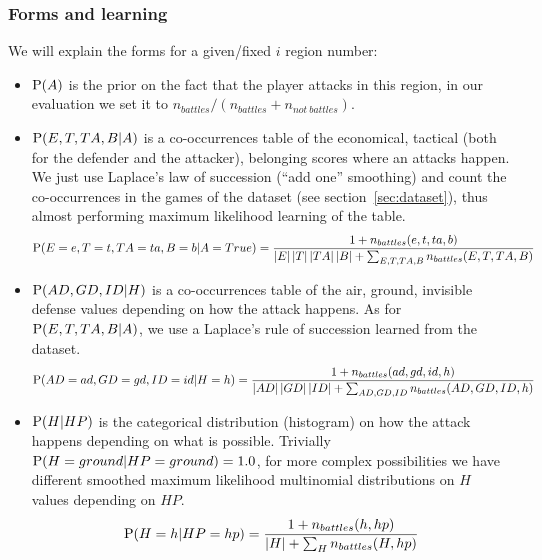 \subsubsection{Forms and learning}
\label{sec:tacticalidentification}
We will explain the forms for a given/fixed $i$ region number:
\begin{itemize}
\item $\mathrm{P}(A)$ is the prior on the fact that the player attacks in this region, in our evaluation we set it to $n_{battles}/(n_{battles}+n_{not\ battles})$. 
\item $\mathrm{P}(E,T,TA,B|A)$ is a co-occurrences table of the economical, tactical (both for the defender and the attacker), belonging scores where an attacks happen. We just use Laplace's law of succession (``add one'' smoothing) \cite{Jaynes} and count the co-occurrences in the games of the dataset (see section~\ref{sec:dataset}), thus almost performing maximum likelihood learning of the table. 
$$\mathrm{P}(E=e,T=t,TA=ta,B=b|A=True) = \frac{1+n_{battles}(e,t,ta,b)}{\left\lvert E\right\rvert \left\lvert T\right\rvert \left\lvert TA\right\rvert \left\lvert B\right\rvert + \sum_{E,T,TA,B} n_{battles}(E,T,TA,B)}$$


\item $\mathrm{P}(AD,GD,ID|H)$ is a co-occurrences table of the air, ground, invisible defense values depending on how the attack happens. As for $\mathrm{P}(E,T,TA,B|A)$, we use a Laplace's rule of succession learned from the dataset.
$$\mathrm{P}(AD=ad,GD=gd,ID=id|H=h) = \frac{1+n_{battles}(ad,gd,id,h)}{\left\lvert AD\right\rvert \left\lvert GD\right\rvert \left\lvert ID\right\rvert + \sum_{AD,GD,ID} n_{battles}(AD,GD,ID,h)}$$

\item $\mathrm{P}(H|HP)$ is the categorical distribution (histogram) on how the attack happens depending on what is possible. Trivially $\mathrm{P}(H=ground|HP=ground)=1.0$, for more complex possibilities we have different smoothed maximum likelihood multinomial distributions on $H$ values depending on $HP$.
$$\mathrm{P}(H=h|HP=hp) = \frac{1 + n_{battles}(h,hp)}{\left\lvert H\right\rvert + \sum_{H} n_{battles}(H,hp)}$$


\end{itemize}
